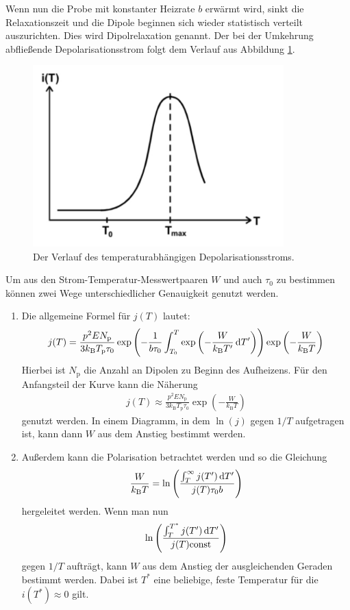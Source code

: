 Wenn nun die Probe mit konstanter Heizrate $b$ erwärmt wird, sinkt die Relaxationszeit und die Dipole beginnen sich wieder statistisch verteilt auszurichten. Dies wird Dipolrelaxation genannt. Der bei der Umkehrung abfließende Depolarisationsstrom folgt dem Verlauf aus Abbildung \ref{fig:stromTemp}.
\begin{figure}
  \centering
  \includegraphics[height= 7cm]{BestNippelpiercings/stromTemp.pdf}
  \caption{Der Verlauf des temperaturabhängigen Depolarisationsstroms. \cite{anleitung}}
  \label{fig:stromTemp}
\end{figure}
Um aus den Strom-Temperatur-Messwertpaaren $W$ und auch $\tau_0$ zu bestimmen können zwei Wege unterschiedlicher Genauigkeit genutzt werden.
\begin{enumerate}
  \item Die allgemeine Formel für $j(T)$ lautet:
    \begin{align}
      j(T) = \frac{p^2 E N_\text{p}}{3k_\text{B} T_\text{p}\tau_0}
      \exp\left(-\frac{1}{b\tau_0} \int_{T_0}^T\exp\left(-\frac{W}{k_\text{B}T'}\mathop{}\!\mathrm{d} T'\right)\right)
      \exp\left(-\frac{W}{k_\text{B}T}\right) \label{eqn:allgjt}
    \end{align}
    Hierbei ist $N_\text{p}$ die Anzahl an Dipolen zu Beginn des Aufheizens.
    Für den Anfangsteil der Kurve kann die Näherung
    \begin{align}
      j(T) \approx \frac{p^2 E N_\text{p}}{3k_\text{B} T_\text{p}\tau_0} \exp\left(-\frac{W}{k_\text{B}T}\right)
    \end{align}
    genutzt werden. In einem Diagramm, in dem $\ln(j)$ gegen $1/T$ aufgetragen ist, kann dann $W$ aus dem Anstieg bestimmt werden.
  \item Außerdem kann die Polarisation betrachtet werden und so die Gleichung
    \begin{align}
      \frac{W}{k_\text{B}T} = \ln\left(\frac{\int_{T}^{\infty} j(T')\mathop{}\!\mathrm{d} T'}{j(T)\tau_0 b}\right)
    \end{align}
    hergeleitet werden. Wenn man nun
    \begin{align*}
      \ln\left(\frac{\int_T^{T^*} j(T')\mathop{}\!\mathrm{d} T'}{j(T) \text{const}}\right)
    \end{align*}
    gegen $1/T$ aufträgt, kann $W$ aus dem Anstieg der ausgleichenden Geraden bestimmt werden. Dabei ist $T^*$ eine beliebige, feste Temperatur für die $i(T^*) \approx 0$ gilt.
\end{enumerate}
